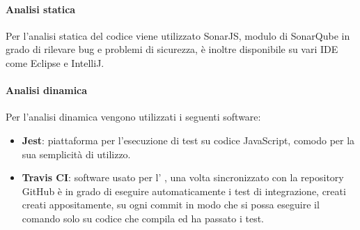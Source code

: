 			\paragraph{Analisi statica} \Spazio
			Per l'analisi statica del codice  viene utilizzato SonarJS, modulo di SonarQube in grado di rilevare bug e problemi di sicurezza, è inoltre disponibile su vari IDE come Eclipse e IntelliJ.
			\paragraph{Analisi dinamica} \Spazio
			Per l'analisi dinamica vengono utilizzati i seguenti software:
			\begin{itemize}
				\item  \textbf{Jest}: piattaforma per l'esecuzione di test su codice JavaScript, comodo per la sua semplicità di utilizzo.
				\item \textbf{Travis CI}: software usato per l' , una volta sincronizzato con la repository GitHub è in grado di eseguire automaticamente i test di integrazione, creati creati appositamente, su ogni commit in modo che si possa eseguire il comando  solo su codice che compila ed ha passato i test.
			\end{itemize}
